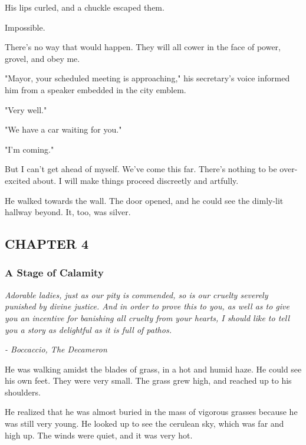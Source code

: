 His lips curled, and a chuckle escaped them.

Impossible.

There's no way that would happen. They will all cower in the face of
power, grovel, and obey me.

"Mayor, your scheduled meeting is approaching," his secretary's voice
informed him from a speaker embedded in the city emblem.

"Very well."

"We have a car waiting for you."

"I'm coming."

But I can't get ahead of myself. We've come this far. There's nothing to
be over-excited about. I will make things proceed discreetly and
artfully.

He walked towards the wall. The door opened, and he could see the
dimly-lit hallway beyond. It, too, was silver.

\hypertarget{index_split_059.htmlux5cux23calibre_pb_85}{}

\protect\hypertarget{index_split_083.html}{}{}

\hypertarget{index_split_083.htmlux5cux23calibre_pb_0}{}

\hypertarget{index_split_083.htmlux5cux23calibre_toc_5}{%
\subsection{CHAPTER 4}\label{index_split_083.htmlux5cux23calibre_toc_5}}

\subsubsection{A Stage of Calamity}

\emph{Adorable ladies, just as our pity is commended, so is our cruelty
severely punished by divine justice. And in order to prove this to you,
as well as to give you an incentive for banishing all cruelty from your
hearts, I should like to tell you a story as delightful as it is full of
pathos.}

\emph{- Boccaccio, The Decameron}

He was walking amidst the blades of grass, in a hot and humid haze. He
could see his own feet. They were very small. The grass grew high, and
reached up to his shoulders.

He realized that he was almost buried in the mass of vigorous grasses
because he was still very young. He looked up to see the cerulean sky,
which was far and high up. The winds were quiet, and it was very hot.~

